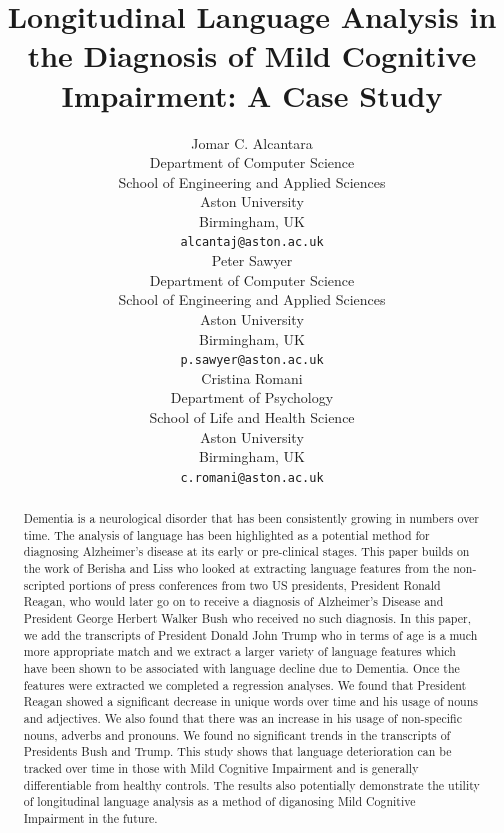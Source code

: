 \documentclass[10pt]{article}
\title{Longitudinal Language Analysis in the Diagnosis of Mild Cognitive Impairment: A Case Study}
\author{
  Jomar C. Alcantara \\
  Department of Computer Science \\
  School of Engineering and Applied Sciences\\
  Aston University\\
  Birmingham, UK \\
  \texttt{alcantaj@aston.ac.uk} \\
  \And
  Peter Sawyer \\
  Department of Computer Science \\
  School of Engineering and Applied Sciences \\
  Aston University\\
  Birmingham, UK \\
  \texttt{p.sawyer@aston.ac.uk} \\
  \And
  Cristina Romani \\
  Department of Psychology \\
  School of Life and Health Science\\
  Aston University\\
  Birmingham, UK \\
  \texttt{c.romani@aston.ac.uk} \\
}
\begin{document}
\maketitle
\begin{abstract}
Dementia is a neurological disorder that has been consistently growing in numbers over time. The analysis of language has been highlighted as a potential method for diagnosing Alzheimer's disease at its early or pre-clinical stages. This paper builds on the work of Berisha and Liss who looked at extracting language features from the non-scripted portions of press conferences from two US presidents, President Ronald Reagan, who would later go on to receive a diagnosis of Alzheimer's Disease and President George Herbert Walker Bush who received no such diagnosis. In this paper, we add the transcripts of President Donald John Trump who in terms of age is a much more appropriate match and we extract a larger variety of language features which have been shown to be associated with language decline due to Dementia. Once the features were extracted we completed a regression analyses. We found that President Reagan showed a significant decrease in unique words over time and his usage of nouns and adjectives. We also found that there was an increase in his usage of non-specific nouns, adverbs and pronouns. We found no significant trends in the transcripts of Presidents Bush and Trump. This study shows that language deterioration can be tracked over time in those with Mild Cognitive Impairment and is generally differentiable from healthy controls. The results also potentially demonstrate the utility of longitudinal language analysis as a method of diganosing Mild Cognitive Impairment in the future.
\end{abstract}
\end{document}
